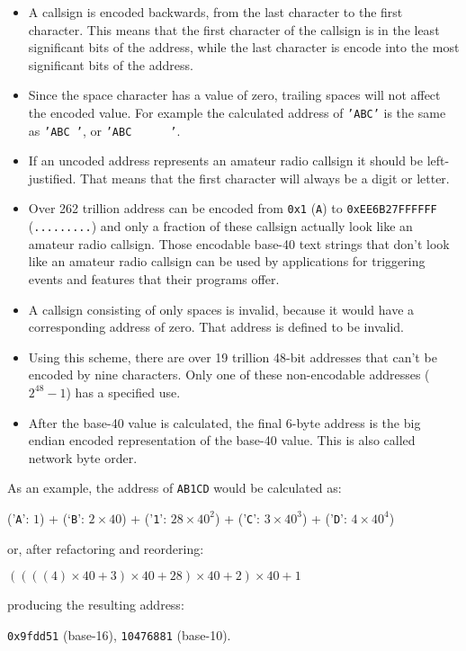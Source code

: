 \documentclass[a4paper,11pt,oneside]{book}
\begin{document}
\begin{itemize}
	\item
		A callsign is encoded backwards, from the last character to the first character. This means that the first character of the callsign is in the least significant bits of the address, while the last character is encode into the most significant bits of the address.
	\item
		Since the space character has a value of zero, trailing spaces will not affect the encoded value. For example the calculated address of \texttt{'ABC'} is the same as \texttt{'ABC~'}, or \texttt{'ABC~~~~~~'}.
	\item
		If an uncoded address represents an amateur radio callsign it should be left-justified. That means that the first character will always be a digit or letter.
	\item
		Over 262 trillion address can be encoded from \texttt{0x1} (\texttt{A}) to \texttt{0xEE6B27FFFFFF} (\texttt{.........}) and only a fraction of these callsign actually look like an amateur radio callsign. Those encodable base-40 text strings that don't look like an amateur radio callsign can be used by applications for triggering events and features that their programs offer.
	\item
		A callsign consisting of only spaces is invalid, because it would have a corresponding address of zero. That address is defined to be invalid.
	\item
		Using this scheme, there are over 19 trillion 48-bit addresses that can't be encoded by nine characters. Only one of these non-encodable addresses ($2^{48}-1$) has a specified use.
	\item
		After the base-40 value is calculated, the final 6-byte address is the big endian encoded representation of the base-40 value. This is also called network byte order.
\end{itemize}

As an example, the address of \texttt{AB1CD} would be calculated as:

('\texttt{A}': $1$) + (`\texttt{B}': $2 \times 40$) + ('\texttt{1}': $28 \times 40^2$) + ('\texttt{C}': $3 \times 40^3$) + ('\texttt{D}': $4 \times 40^4$)

or, after refactoring and reordering:

$( ( ( ( 4 ) \times 40 + 3 ) \times 40 + 28 ) \times 40 + 2 ) \times 40 + 1$

producing the resulting address:

\texttt{0x9fdd51} (base-16), \texttt{10476881} (base-10).
\end{document}
